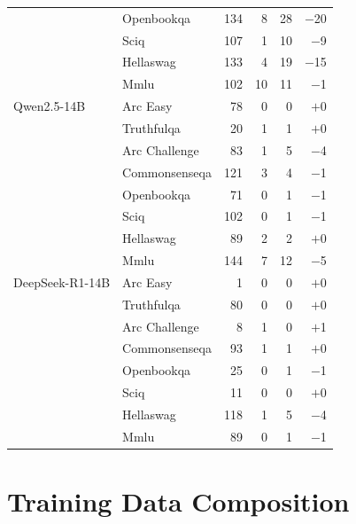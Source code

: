 \documentclass[11pt,a4paper]{article}
\begin{document}
\begin{table}[H]
\begin{tabular}{@{}llrrrr@{}}
                     & Openbookqa         & 134 & 8 & 28 & $-$20 \\
                     & Sciq               & 107 & 1 & 10 & $-$9 \\
                     & Hellaswag          & 133 & 4 & 19 & $-$15 \\
                     & Mmlu               & 102 & 10 & 11 & $-$1 \\
\midrule
Qwen2.5-14B          & Arc Easy           & 78 & 0 & 0 & $+$0 \\
                     & Truthfulqa         & 20 & 1 & 1 & $+$0 \\
                     & Arc Challenge      & 83 & 1 & 5 & $-$4 \\
                     & Commonsenseqa      & 121 & 3 & 4 & $-$1 \\
                     & Openbookqa         & 71 & 0 & 1 & $-$1 \\
                     & Sciq               & 102 & 0 & 1 & $-$1 \\
                     & Hellaswag          & 89 & 2 & 2 & $+$0 \\
                     & Mmlu               & 144 & 7 & 12 & $-$5 \\
\midrule
DeepSeek-R1-14B      & Arc Easy           & 1 & 0 & 0 & $+$0 \\
                     & Truthfulqa         & 80 & 0 & 0 & $+$0 \\
                     & Arc Challenge      & 8 & 1 & 0 & $+$1 \\
                     & Commonsenseqa      & 93 & 1 & 1 & $+$0 \\
                     & Openbookqa         & 25 & 0 & 1 & $-$1 \\
                     & Sciq               & 11 & 0 & 0 & $+$0 \\
                     & Hellaswag          & 118 & 1 & 5 & $-$4 \\
                     & Mmlu               & 89 & 0 & 1 & $-$1 \\
\bottomrule
\end{tabular}
\end{table}



\section{Training Data Composition}
\label{app:training-data}
\end{document}
